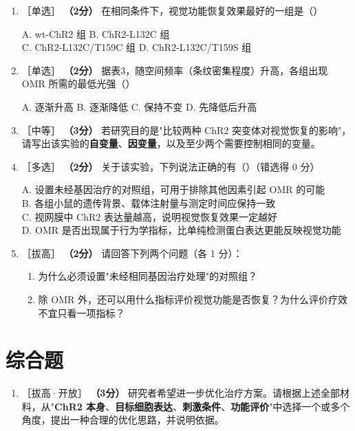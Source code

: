 \documentclass[UTF8,a4paper,11pt]{ctexart}
\newcommand{\pt}[1]{\textbf{（#1分）}}
\newcommand{\lv}[1]{{\small\color{deepgreen}［#1］}}
\newcommand{\tian}[1]{\underline{\hspace{#1}}}
\newcommand{\choice}[1]{\par\smallskip\noindent #1\par}
\begin{document}
\begin{enumerate}[leftmargin=2.2em,itemsep=5pt,start=11]
\item \lv{单选} \pt{2} 在相同条件下，视觉功能恢复效果最好的一组是（\quad）\\
\choice{A. wt-ChR2 组 \quad B. ChR2-L132C 组\\
C. ChR2-L132C/T159C 组 \quad D. ChR2-L132C/T159S 组}

\item \lv{单选} \pt{2} 据表3，随空间频率（条纹密集程度）升高，各组出现 OMR 所需的最低光强（\quad）\\
\choice{A. 逐渐升高 \quad B. 逐渐降低 \quad C. 保持不变 \quad D. 先降低后升高}

\item \lv{中等} \pt{3} 若研究目的是"比较两种 ChR2 突变体对视觉恢复的影响"，请写出该实验的\textbf{自变量}、\textbf{因变量}，以及至少两个需要控制相同的变量。\tian{0.48\textwidth}

\item \lv{多选} \pt{2} 关于该实验，下列说法正确的有（\quad）（错选得 0 分）\\
\choice{A. 设置未经基因治疗的对照组，可用于排除其他因素引起 OMR 的可能\\
B. 各组小鼠的遗传背景、载体注射量与测定时间应保持一致\\
C. 视网膜中 ChR2 表达量越高，说明视觉恢复效果一定越好\\
D. OMR 是否出现属于行为学指标，比单纯检测蛋白表达更能反映视觉功能}

\item \lv{拔高} \pt{2} 请回答下列两个问题（各 1 分）：
\begin{enumerate}[label=(\arabic*),leftmargin=1.4em,itemsep=2pt]
\item 为什么必须设置"未经相同基因治疗处理"的对照组？
\item 除 OMR 外，还可以用什么指标评价视觉功能是否恢复？为什么评价疗效不宜只看一项指标？
\end{enumerate}
\end{enumerate}

\section{综合题}

\begin{enumerate}[leftmargin=2.2em,itemsep=5pt,start=16]
\item \lv{拔高·开放} \pt{3} 研究者希望进一步优化治疗方案。请根据上述全部材料，从"\textbf{ChR2 本身}、\textbf{目标细胞表达}、\textbf{刺激条件}、\textbf{功能评价}"中选择一个或多个角度，提出一种合理的优化思路，并说明依据。
\end{enumerate}
\end{document}
